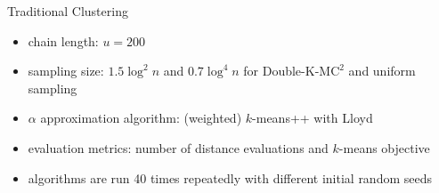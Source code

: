 \documentclass{beamer}
\begin{document}
\begin{frame}{Traditional Clustering}
	\begin{center}
	\end{center}
	\begin{itemize}
		\scriptsize
		\item chain length: $u=200$
		\item sampling size: $1.5 \log^2 n$ and $0.7 \log^4 n$ for Double-K-M$\text{C}^2$ and uniform sampling
		\item $\alpha$ approximation algorithm: (weighted) $k$-means++ with Lloyd
		\item evaluation metrics: number of distance evaluations and $k$-means objective
		\item algorithms are run 40 times repeatedly with different initial random seeds
	\end{itemize}
\end{frame}
\end{document}
